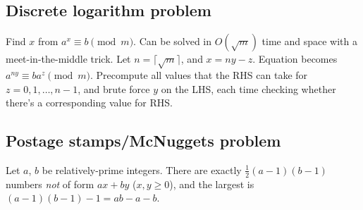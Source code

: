 \documentclass[12pt]{extarticle}
\begin{document}
\begin{multicols*}{2}



\subsection{Discrete logarithm problem}  Find $x$ from $a^x \equiv b \pmod{m}$.
Can be solved in $O(\sqrt{m})$ time and space with a meet-in-the-middle trick.
Let $n = \lceil \sqrt{m} \rceil$, and $x = ny - z$.
Equation becomes $a^{ny} \equiv b a^z \pmod{m}$.  Precompute all values that
the RHS can take for $z = 0, 1, \dots, n-1$, and brute force $y$ on the LHS,
each time checking whether there's a corresponding value for RHS.



\subsection{Postage stamps/McNuggets problem}  Let $a$, $b$ be relatively-prime integers.
There are exactly $\frac{1}{2}(a-1)(b-1)$ numbers \emph{not} of form $ax+by$ ($x,y \ge 0$),
and the largest is $(a-1)(b-1)-1 = ab - a - b$.


\end{multicols*}
\end{document}

